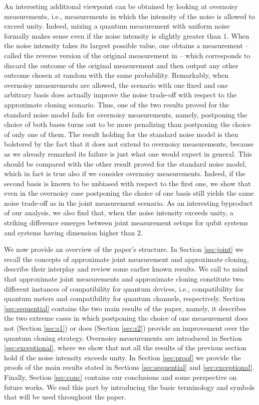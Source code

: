 \documentclass[12pt,reqno]{amsart}
\theoremstyle{definition}
\begin{document}
An interesting additional viewpoint can be obtained by looking at overnoisy measurements, i.e., measurements in which the intensity of the noise is allowed to exceed unity. Indeed, mixing a quantum measurement with uniform noise formally makes sense even if the noise intensity is slightly greater than $1$. When the noise intensity takes its largest possible value, one obtains a measurement -- called the reverse version of the original measurement in \cite{FiHeLe17} -- which corresponds to discard the outcome of the original measurement and then output any other outcome chosen at random with the same probability. Remarkably, when overnoisy measurements are allowed, the scenario with one fixed and one arbitrary basis does actually improve the noise trade-off with respect to the approximate cloning scenario. Thus, one of the two results proved for the standard noise model fails for overnoisy measurements, namely, postponing the choice of both bases turns out to be more penalizing than postponing the choice of only one of them. The result holding for the standard noise model is then bolstered by the fact that it does not extend to overnoisy measurements, because as we already remarked its failure is just what one would expect in general. This should be compared with the other result proved for the standard noise model, which in fact is true also if we consider overnoisy measurements. Indeed, if the second basis is known to be unbiased with respect to the first one, we show that even in the overnoisy case postponing the choice of one basis still yields the same noise trade-off as in the joint measurement scenario. As an interesting byproduct of our analysis, we also find that, when the noise intensity exceeds unity, a striking difference emerges between joint measurement setups for qubit systems and systems having dimension higher than $2$.

We now provide an overview of the paper's structure. 
In Section \ref{sec:joint} we recall the concepts of approximate joint measurement and approximate cloning, describe their interplay and review some earlier known results. 
We call to mind that approximate joint measurements and approximate cloning constitute two different instances of compatibility for quantum devices, i.e., compatibility for quantum meters and compatibility for quantum channels, respectively. Section \ref{sec:sequential} contains the two main results of the paper, namely, it describes the two extreme cases in which postponing the choice of one measurement does not (Section \ref{sec:s1}) or does (Section \ref{sec:s2}) provide an improvement over the quantum cloning strategy. Overnoisy measurements are introduced in Section \ref{sec:exceptional}, where we show that not all the results of the previous section hold if the noise intensity exceeds unity. In Section \ref{sec:proof} we provide the proofs of the main results stated in Sections \ref{sec:sequential} and \ref{sec:exceptional}. Finally, Section \ref{sec:conc} contains our conclusions and some perspective on future works. We end this part by introducing the basic terminology and symbols that will be used throughout the paper.
\end{document}
